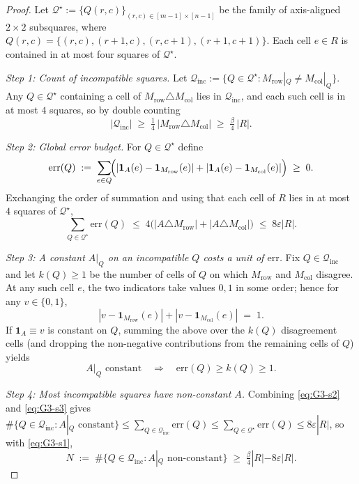 \begin{proof}
Let $\mathcal Q^\star:=\{Q(r,c)\}_{(r,c)\in[m-1]\times[n-1]}$ be the
family of axis-aligned $2{\times}2$ subsquares, where
$Q(r,c)=\{(r,c),(r{+}1,c),(r,c{+}1),(r{+}1,c{+}1)\}$. Each cell
$e\in R$ is contained in at most four squares of $\mathcal Q^\star$.

\smallskip\noindent\emph{Step 1: Count of incompatible squares.}
Let $\mathcal Q_{\mathrm{inc}}:=\{Q\in\mathcal Q^\star:M_{\mathrm{row}}|_Q\ne M_{\mathrm{col}}|_Q\}$.
Any $Q\in\mathcal Q^\star$ containing a cell of
$M_{\mathrm{row}}\triangle M_{\mathrm{col}}$ lies in
$\mathcal Q_{\mathrm{inc}}$, and each such cell is in at most $4$
squares, so by double counting
\begin{equation}\label{eq:G3-s1}
|\mathcal Q_{\mathrm{inc}}|
\;\ge\;\tfrac14\,|M_{\mathrm{row}}\triangle M_{\mathrm{col}}|
\;\ge\;\tfrac{\beta}{4}\,|R|.
\end{equation}

\smallskip\noindent\emph{Step 2: Global error budget.}
For $Q\in\mathcal Q^\star$ define
\[
\mathrm{err}(Q)\;:=\;\sum_{e\in Q}\!\Bigl(|\mathbf 1_A(e)-\mathbf 1_{M_{\mathrm{row}}}(e)|
+|\mathbf 1_A(e)-\mathbf 1_{M_{\mathrm{col}}}(e)|\Bigr)\;\ge\;0.
\]
Exchanging the order of summation and using that each cell of $R$
lies in at most $4$ squares of $\mathcal Q^\star$,
\begin{equation}\label{eq:G3-s2}
\sum_{Q\in\mathcal Q^\star}\!\mathrm{err}(Q)
\;\le\;4\bigl(|A\triangle M_{\mathrm{row}}|+|A\triangle M_{\mathrm{col}}|\bigr)
\;\le\;8\varepsilon|R|.
\end{equation}

\smallskip\noindent\emph{Step 3: A constant $A|_Q$ on an incompatible
$Q$ costs a unit of $\mathrm{err}$.}
Fix $Q\in\mathcal Q_{\mathrm{inc}}$ and let $k(Q)\ge1$ be the number of
cells of $Q$ on which $M_{\mathrm{row}}$ and $M_{\mathrm{col}}$ disagree.
At any such cell $e$, the two indicators take values $0,1$ in some
order; hence for any $v\in\{0,1\}$,
\[
|v-\mathbf 1_{M_{\mathrm{row}}}(e)|+|v-\mathbf 1_{M_{\mathrm{col}}}(e)|
\;=\;1.
\]
If $\mathbf 1_A\equiv v$ is constant on $Q$, summing the above over the
$k(Q)$ disagreement cells (and dropping the non-negative contributions
from the remaining cells of $Q$) yields
\begin{equation}\label{eq:G3-s3}
A|_Q\text{ constant}\quad\Longrightarrow\quad
\mathrm{err}(Q)\ge k(Q)\ge1.
\end{equation}

\smallskip\noindent\emph{Step 4: Most incompatible squares have
non-constant $A$.} Combining \eqref{eq:G3-s2} and \eqref{eq:G3-s3}
gives
$\#\{Q\in\mathcal Q_{\mathrm{inc}}:A|_Q\text{ constant}\}
\le\sum_{Q\in\mathcal Q_{\mathrm{inc}}}\mathrm{err}(Q)
\le\sum_{Q\in\mathcal Q^\star}\mathrm{err}(Q)
\le8\varepsilon|R|$, so with \eqref{eq:G3-s1},
\begin{equation}\label{eq:G3-s4}
N\;:=\;\#\{Q\in\mathcal Q_{\mathrm{inc}}:A|_Q\text{ non-constant}\}
\;\ge\;\tfrac{\beta}{4}|R|-8\varepsilon|R|.
\end{equation}


\end{proof}
